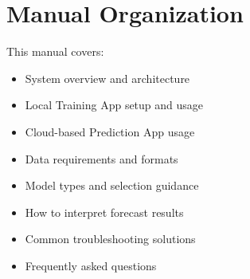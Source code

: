 \section{Manual Organization}

This manual covers:
\begin{itemize}
	\item System overview and architecture
	\item Local Training App setup and usage
	\item Cloud-based Prediction App usage
	\item Data requirements and formats
	\item Model types and selection guidance
	\item How to interpret forecast results
	\item Common troubleshooting solutions
	\item Frequently asked questions
\end{itemize}